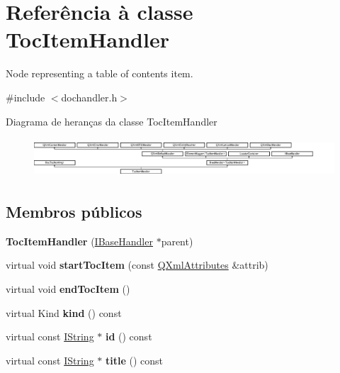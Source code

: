 \hypertarget{class_toc_item_handler}{\section{Referência à classe Toc\-Item\-Handler}
\label{class_toc_item_handler}
}


Node representing a table of contents item.  




{\ttfamily \#include $<$dochandler.\-h$>$}

Diagrama de heranças da classe Toc\-Item\-Handler\begin{figure}[H]
\begin{center}
\leavevmode
\includegraphics[height=1.454545cm]{class_toc_item_handler}
\end{center}
\end{figure}
\subsection*{Membros públicos}
\begin{DoxyCompactItemize}
\item 
\hypertarget{class_toc_item_handler_a9e00a3eabd3e97d4c63036d33e078a16}{{\bfseries Toc\-Item\-Handler} (\hyperlink{class_i_base_handler}{I\-Base\-Handler} $\ast$parent)}\label{class_toc_item_handler_a9e00a3eabd3e97d4c63036d33e078a16}

\item 
\hypertarget{class_toc_item_handler_ae85f3241e4f1b89c59bd04530df4a69f}{virtual void {\bfseries start\-Toc\-Item} (const \hyperlink{class_q_xml_attributes}{Q\-Xml\-Attributes} \&attrib)}\label{class_toc_item_handler_ae85f3241e4f1b89c59bd04530df4a69f}

\item 
\hypertarget{class_toc_item_handler_a4d3487eaea34fa6ccffbe50017bafe49}{virtual void {\bfseries end\-Toc\-Item} ()}\label{class_toc_item_handler_a4d3487eaea34fa6ccffbe50017bafe49}

\item 
\hypertarget{class_toc_item_handler_af8e62c8a81ddf2283205cc8955de50eb}{virtual Kind {\bfseries kind} () const }\label{class_toc_item_handler_af8e62c8a81ddf2283205cc8955de50eb}

\item 
\hypertarget{class_toc_item_handler_acf656d73faffcdf0382f68eb78869cf4}{virtual const \hyperlink{class_i_string}{I\-String} $\ast$ {\bfseries id} () const }\label{class_toc_item_handler_acf656d73faffcdf0382f68eb78869cf4}

\item 
\hypertarget{class_toc_item_handler_ac0fa44113c5ddbd89a1f6a837a7bca67}{virtual const \hyperlink{class_i_string}{I\-String} $\ast$ {\bfseries title} () const }\label{class_toc_item_handler_ac0fa44113c5ddbd89a1f6a837a7bca67}

\end{DoxyCompactItemize}
